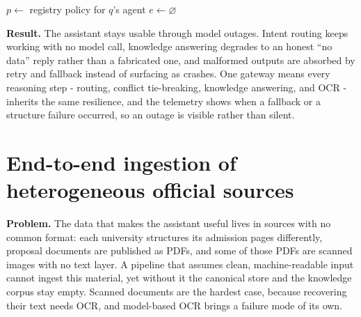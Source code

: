 \documentclass[../main.tex]{subfiles}
\begin{document}
\begin{algorithm}[H]
\caption{Inference gateway: hard- vs structure-failure handling}
\label{alg:gateway}
$p \leftarrow$ registry policy for $q$'s agent 
$e \leftarrow \varnothing$ 
\end{algorithm}

\textbf{Result.}
The assistant stays usable through model outages.
Intent routing keeps working with no model call, knowledge answering degrades to an honest ``no data'' reply rather than a fabricated one, and malformed outputs are absorbed by retry and fallback instead of surfacing as crashes.
One gateway means every reasoning step - routing, conflict tie-breaking, knowledge answering, and \gls{OCR} - inherits the same resilience, and the telemetry shows when a fallback or a structure failure occurred, so an outage is visible rather than silent.

\section{End-to-end ingestion of heterogeneous official sources}
\label{section:5.2}

\textbf{Problem.}
The data that makes the assistant useful lives in sources with no common format: each university structures its admission pages differently, proposal documents are published as \gls{PDF}s, and some of those \gls{PDF}s are scanned images with no text layer.
A pipeline that assumes clean, machine-readable input cannot ingest this material, yet without it the canonical store and the knowledge corpus stay empty.
Scanned documents are the hardest case, because recovering their text needs \gls{OCR}, and model-based \gls{OCR} brings a failure mode of its own.
\end{document}
